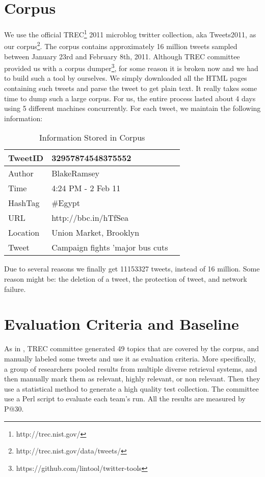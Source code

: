 \documentclass{acm_proc_article-sp}
\begin{document}
\section{Corpus}
We use the official TREC\footnote{http://trec.nist.gov/} 2011 microblog twitter collection, aka Tweets2011, as our corpus\footnote{http://trec.nist.gov/data/tweets/}. The corpus contains approximately 16 million tweets sampled between January 23rd and February 8th, 2011. Although TREC committee provided us with a corpus dumper\footnote{https://github.com/lintool/twitter-tools}, for some reason it is broken now and we had to build such a tool by ourselves. We simply downloaded all the HTML pages containing such tweets and parse the tweet to get plain text. It really takes some time to dump such a large corpus. For us, the entire process lasted about 4 days using 5 different machines concurrently. For each tweet, we maintain the following information:
\begin{table}
\centering
\caption{Information Stored in Corpus}
\begin{tabular}{|l|l|l} \hline
TweetID&32957874548375552\\ \hline
Author&BlakeRamsey\\ \hline
Time&4:24 PM - 2 Feb 11\\ \hline
HashTag& \#Egypt\\ \hline
URL&http://bbc.in/hTfSea\\ \hline
Location&Union Market, Brooklyn\\ \hline
Tweet&Campaign fights 'major bus cuts\\ \hline
\hline\end{tabular}
\end{table}
Due to several reasons we finally get 11153327 tweets, instead of 16 million. Some reason might be: the deletion of a tweet, the protection of tweet, and network failure.

\section{Evaluation Criteria and Baseline}
As in \cite{soboroff2012evaluating}, TREC committee generated 49 topics that are covered by the corpus, and manually labeled some tweets and use it as evaluation criteria. More specifically, a group of researchers pooled results from multiple diverse retrieval systems, and then manually mark them as relevant, highly relevant, or non relevant. Then they use a statistical method \cite{voorhees2005trec} to generate a high quality test collection. The committee use a Perl script to evaluate each team's run. All the results are measured by P@30.
\end{document}

